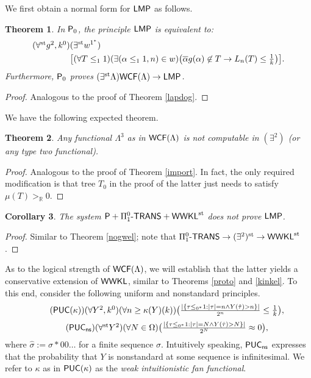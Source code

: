 \documentclass[reqno]{amsart}
\newtheorem{thm}{Theorem}
\newtheorem{cor}[thm]{Corollary}
\newcommand\be{\begin{equation}}
\newcommand\ee{\end{equation}}
\def\STP{\textup{\textsf{STP}}}
\def\ns{\textup{\textsf{ns}}}
\def\({\textup{(}}
\def\){\textup{)}}
\def\PUC{\textup{\textsf{PUC}}}
\def\WWKL{\textup{\textsf{WWKL}}}
\def\P{\textup{\textsf{P}}}
\def\R{{\mathbb  R}}
\def\PUC{\textup{\textsf{PUC}}}
\def\st{\textup{st}}
\def\di{\rightarrow}
\def\paai{\Pi_{1}^{0}\textup{-\textsf{TRANS}}}
\def\LMP{\textup{\textsf{LMP}}}
\def\WCF{\textup{\textsf{WCF}}}
\numberwithin{equation}{section}
\numberwithin{thm}{section}
\begin{document}
We first obtain a normal form for $\LMP$ as follows.  
\begin{thm}\label{lapdoc}
In $\P_{0}$, the principle $\LMP$ is equivalent to:
\begin{align}\label{w2}\textstyle
(\forall^{\st}g^{2},k^{0})&(\exists^{\st}w^{1^{*}})\\
&\textstyle\notag\big[(\forall T\leq_{1}1)(\exists ( \alpha\leq_{1}1, n) \in w)\big(\overline{\alpha}g(\alpha)\not\in T\di L_{n}(T)\leq\frac1k\big)\big].
\end{align}  
Furthermore, $\P_{0}$ proves $(\exists^{\st} \Lambda)\WCF(\Lambda)\di \LMP$.  
\end{thm}
\begin{proof}
Analogous to the proof of Theorem \ref{lapdog}. 
\end{proof}
We have the following expected theorem.
\begin{thm}\label{import22}
Any functional $\Lambda^{3}$ as in $\WCF(\Lambda)$ is not computable in $(\exists^{2})$ \(or any type two functional\).   
\end{thm}
\begin{proof}
Analogous to the proof of Theorem \ref{import}.  In fact, the only required modification is that tree $T_{0}$ in the proof of the latter just needs to satisfy $\mu(T)>_{\R}0$.  
\end{proof}
 \begin{cor}
The system $\P+\paai+\WWKL^{\st}$ does not prove $\LMP$.  
\end{cor}
\begin{proof}
Similar to Theorem \ref{nogwel}; note that $\paai\di (\exists^{2})^{\st}\di \WWKL^{\st}$.
\end{proof}
As to the logical strength of $\WCF(\Lambda)$, we will establish that the latter yields a conservative extension of $\WWKL$, similar to Theorems \ref{proto} and \ref{kinkel}.  
To this end, consider the following uniform and nonstandard principles.  
\be\tag{$\PUC(\kappa)$}\textstyle
(\forall Y^{2},k^{0})(\forall n\geq \kappa(Y)(k))\big( \frac{| \{ \tau\leq_{0^{*}}1 : |\tau|=n\wedge Y(\hat{\tau})> n  \}   |}{2^{n}}   \leq\frac{1}{k}   \big),   %
\ee
\be\tag{$\PUC_{\ns}$}\textstyle
(\forall^{\st} Y^{2})(\forall N\in \Omega)\big( \frac{| \{ \tau\leq_{0^{*}}1 : |\tau|=N\wedge Y(\hat{\tau})>N \}   |}{2^{N}}  \approx 0  \big),   %
\ee
where $\hat{\sigma}:=\sigma*00\dots$ for a finite sequence $\sigma$.  
Intuitively speaking, $\PUC_{\ns}$ expresses that the probability that $Y$ is nonstandard at some sequence is infinitesimal.  
We refer to $\kappa$ as in $\PUC(\kappa)$ as the \emph{weak intuitionistic fan functional}.  
\end{document}
